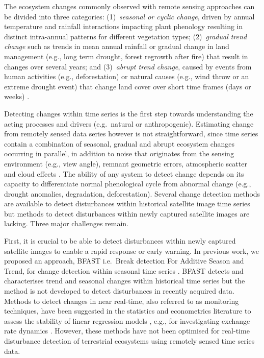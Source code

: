 \documentclass[authoryear,preprint,review,10pt]{elsarticle}
\begin{document}
The ecosystem changes commonly observed with remote sensing approaches can be divided into three categories: (1)~\emph{seasonal or cyclic change}, driven by annual temperature and rainfall interactions impacting plant phenology resulting in distinct intra-annual patterns for different vegetation types; (2)~\emph{gradual trend change} such as trends in mean annual rainfall or gradual change in land management (e.g., long term drought, forest regrowth after fire) that result in changes over several years; and (3)~\emph{abrupt trend change}, caused by events from human activities (e.g., deforestation) or natural causes (e.g., wind throw or an extreme drought event) that change land cover over short time frames (days or weeks) 
\citep{Beurs2005a,Verbesselt2009a,Verbesselt:2010wo}. 

Detecting changes within time series is the first step towards understanding the acting processes and drivers (e.g.\ natural or anthropogenic). Estimating change from remotely sensed data series however is not straightforward, since time series contain a combination of seasonal, gradual and abrupt ecosystem changes occurring in parallel, in addition to noise that originates from the sensing environment (e.g., view angle), remnant geometric errors, atmospheric scatter and cloud effects \citep{Beurs2005a, Roy2002, Wolfe1998}. The ability of any system to detect change depends on its capacity to differentiate normal phenological cycle from abnormal change (e.g., drought anomalies, degradation, deforestation). 
Several change detection methods are available to detect disturbances within historical satellite image time series \citep{Bontemps:2008vn, deBeurs:2005jq, Verbesselt2009a, Verbesselt:2010wo, White2006} but methods to detect disturbances within newly captured satellite images are lacking. Three major challenges remain.

First, it is crucial to be able to detect disturbances within newly captured satellite images to enable a rapid response or early warning. In previous work, we proposed an approach,  BFAST i.e.\ Break detection For Additive Season and Trend, for change detection within seasonal time series \citep{deJong:wo, Verbesselt2009a,Verbesselt:2010wo}.
BFAST detects and characterises trend and seasonal changes within historical time series but the method is not developed to detect disturbances in recently
acquired data. Methods to detect changes in near real-time, also referred to as monitoring techniques, have been suggested in the statistics and
econometrics literature to assess the stability of linear regression models \citep{Chu1996}, e.g., for investigating exchange rate dynamics
\citep{Zeileis:2010tt}. However, these methods have not been optimised for real-time disturbance detection of terrestrial ecosystems using remotely sensed time series data.
\end{document}
